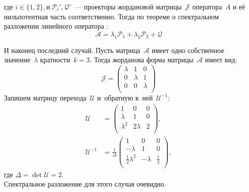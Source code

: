 где $i \in \{1,2\}, \text{и}\  \mathcal{P}_i', \mathcal{Q}'$~--- проекторы жордановой матрицы~$\mathcal{J}$ 
оператора~$A$ и её нильпотентная часть соответственно. Тогда по теореме о спектральном разложении линейного оператора \cite{baskakov}:
$$
	\mathcal{A} = \lambda_1\mathcal{P}_1 + \lambda_2\mathcal{P}_2 + \mathcal{Q} 
$$

И наконец последний случай.		
Пусть матрица~$\mathcal{A}$ имеет одно собственное значение~$\lambda$ 
кратности~$k=3$. Тогда жорданова форма матрицы~$\mathcal{A}$ имеет вид:
$$
 \mathcal{J} = 
 \begin{pmatrix}
  \lambda & 1 & 0\\
  0 & \lambda & 1 \\
  0 & 0 & \lambda \\
 \end{pmatrix}
$$
Запишем матрицу перехода~$\mathcal{U}$ и~обратную к~ней~$\mathcal{U}^{-1}$:
$$
\begin{aligned}
 \mathcal{U} &= 
 \begin{pmatrix}
  	1 & 0 & 0\\
  	\lambda & 1 & 0 \\
  	\lambda^2 & 2\lambda & 2 \\
 \end{pmatrix}, \\
 \mathcal{U}^{-1} &= \frac{1}{\Delta} 
 \begin{pmatrix}
  	1 & 0 & 0  \\
  	-\lambda & 1 & 0  \\
  	\frac{1}{2}\lambda^2 & -\lambda & \frac{1}{2} \\
 \end{pmatrix},
\end{aligned}
$$
где $\Delta = \det \mathcal{U} = 2$. \\
Спектральное разложение для этого случая очевидно.